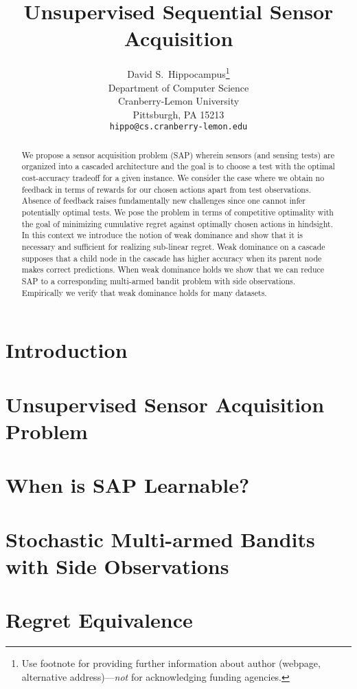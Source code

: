 \documentclass{article}
\title{Unsupervised Sequential Sensor Acquisition}
\author{
	David S.~Hippocampus\thanks{Use footnote for providing further
		information about author (webpage, alternative
		address)---\emph{not} for acknowledging funding agencies.} \\
	Department of Computer Science\\
	Cranberry-Lemon University\\
	Pittsburgh, PA 15213 \\
	\texttt{hippo@cs.cranberry-lemon.edu} \\
}
\begin{document}
	
	\maketitle
	
	\begin{abstract}
		We propose a sensor acquisition problem (SAP) wherein sensors (and sensing tests) are organized into a cascaded architecture and the goal is to choose a test with the optimal cost-accuracy tradeoff for a given instance. We consider the case where we obtain no feedback in terms of rewards for our chosen actions apart from test observations. Absence of feedback raises fundamentally new challenges since one cannot infer potentially optimal tests. We pose the problem in terms of competitive optimality with the goal of minimizing cumulative regret against optimally chosen actions in hindsight. In this context we introduce the notion of weak dominance and show that it is necessary and sufficient for realizing sub-linear regret. Weak dominance on a cascade supposes that a child node in the cascade has higher accuracy when its parent node makes correct predictions. When weak dominance holds we show that we can reduce SAP to a corresponding multi-armed bandit problem with side observations. Empirically we verify that weak dominance holds for many datasets.
	\end{abstract}

\section{Introduction}


\section{Unsupervised Sensor Acquisition Problem}
\label{sec:Setup}


\section{When is SAP Learnable?}


\section{Stochastic Multi-armed Bandits with Side Observations}


\section{Regret Equivalence}

\end{document}
